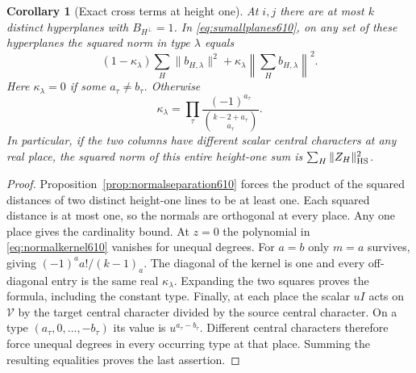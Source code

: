 \documentclass[a4paper,11pt]{article}
\newtheorem{corollary}[proposition]{Corollary}
\theoremstyle{definition}
\theoremstyle{remark}
\numberwithin{equation}{section}
\begin{document}
\begin{corollary}[Exact cross terms at height one]
\leavevmode\label{cor:heightoneplanes610}
At \(i,j\) there are at most \(k\) distinct hyperplanes with
\(B_{H^\perp}=1\). In \eqref{eq:sumallplanes610}, on any set
of these hyperplanes the squared norm in type \(\lambda\) equals
\[
   (1-\kappa_\lambda)\sum_H\|b_{H,\lambda}\|^2+
                    \kappa_\lambda\left\|\sum_H b_{H,\lambda}\right\|^2 .
\]
Here \(\kappa_\lambda=0\) if some \(a_\tau\ne b_\tau\). Otherwise
\[
   \kappa_\lambda=\prod_\tau
          \frac{(-1)^{a_\tau}}{\binom{k-2+a_\tau}{a_\tau}} .
\]
In particular, if the two columns have different scalar central
characters at any real place, the squared norm of this entire
height-one sum is \(\sum_H\|Z_H\|_{\rm HS}^2\).
\end{corollary}
\begin{proof}
Proposition~\ref{prop:normalseparation610} forces the product
of the squared distances of two distinct height-one lines to be
at least one. Each squared distance is at most one, so the normals
are orthogonal at every place. Any one place gives the cardinality
bound. At \(z=0\) the polynomial in \eqref{eq:normalkernel610}
vanishes for unequal degrees. For \(a=b\) only \(m=a\) survives,
giving \((-1)^a a!/(k-1)_a\). The diagonal of the kernel is one
and every off-diagonal entry is the same real \(\kappa_\lambda\).
Expanding the two squares proves the formula, including the
constant type. Finally, at each place the scalar \(uI\) acts on
\(\mathcal V\) by the target central character divided by the source
central character. On a type \((a_\tau,0,\ldots,-b_\tau)\) its
value is \(u^{a_\tau-b_\tau}\). Different central characters
therefore force unequal degrees in every occurring type at that
place. Summing the resulting equalities proves the last assertion.
\end{proof}
\end{document}
